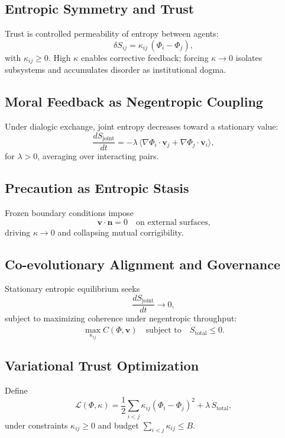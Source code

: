 \documentclass[12pt]{article}
\begin{document}
\subsection{Entropic Symmetry and Trust}
Trust is controlled permeability of entropy between agents:
\begin{equation}
\delta S_{ij}=\kappa_{ij}\,(\Phi_i-\Phi_j),
\end{equation}
with \(\kappa_{ij}\ge 0\). High \(\kappa\) enables corrective feedback; forcing \(\kappa\to 0\) isolates subsystems and accumulates disorder as institutional dogma.

\subsection{Moral Feedback as Negentropic Coupling}
Under dialogic exchange, joint entropy decreases toward a stationary value:
\begin{equation}
\frac{dS_{\text{joint}}}{dt} = -\lambda\,\big\langle \nabla\Phi_i\cdot \mathbf{v}_j + \nabla\Phi_j\cdot \mathbf{v}_i \big\rangle,
\end{equation}
for \(\lambda>0\), averaging over interacting pairs.

\subsection{Precaution as Entropic Stasis}
Frozen boundary conditions impose
\begin{equation}
\mathbf{v}\cdot \mathbf{n} = 0 \quad \text{on external surfaces,}
\end{equation}
driving \(\kappa\to 0\) and collapsing mutual corrigibility.

\subsection{Co-evolutionary Alignment and Governance}
Stationary entropic equilibrium seeks
\begin{equation}
\frac{dS_{\text{joint}}}{dt} \to 0,
\end{equation}
subject to maximizing coherence under negentropic throughput:
\begin{equation}
\max_{\kappa_{ij}} C(\Phi,\mathbf{v}) \quad \text{subject to}\quad \dot S_{\text{total}}\le 0.
\end{equation}

\subsection{Variational Trust Optimization}
Define
\begin{equation}
\mathcal{L}(\Phi,\kappa)=\frac{1}{2}\sum_{i<j}\kappa_{ij}(\Phi_i-\Phi_j)^2+\lambda\,\dot S_{\text{total}},
\end{equation}
under constraints \(\kappa_{ij}\ge 0\) and budget \(\sum_{i<j}\kappa_{ij}\le B\).
\end{document}
